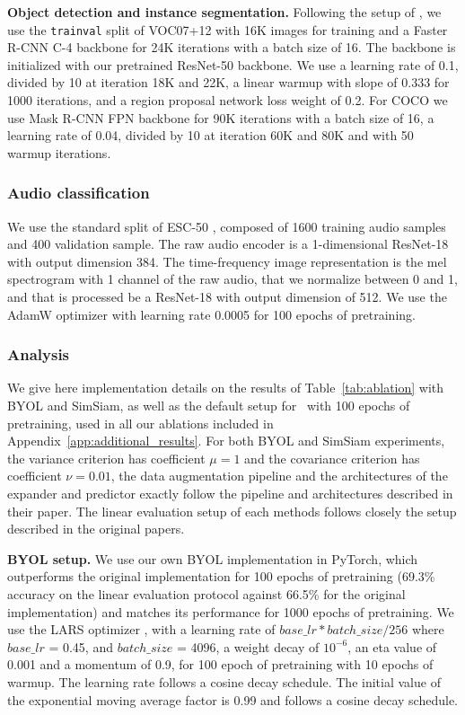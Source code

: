 \textbf{Object detection and instance segmentation.} Following the setup of \cite{he2020moco, zbontar2021barlow}, we use the \texttt{trainval} split of VOC07+12 with 16K images for training and a Faster R-CNN C-4 backbone for 24K iterations with a batch size of 16. The backbone is initialized with our pretrained ResNet-50 backbone. We use a learning rate of 0.1, divided by 10 at iteration 18K and 22K, a linear warmup with slope of 0.333 for 1000 iterations, and a region proposal network loss weight of 0.2. For COCO we use Mask R-CNN FPN backbone for 90K iterations with a batch size of 16, a learning rate of 0.04, divided by 10 at iteration 60K and 80K and with 50 warmup iterations.

\subsubsection{Audio classification} \label{app:audio}
We use the standard split of ESC-50 \cite{piczak2015dataset}, composed of 1600 training audio samples and 400 validation sample. The raw audio encoder is a 1-dimensional ResNet-18 with output dimension 384. The time-frequency image representation is the mel spectrogram with 1 channel of the raw audio, that we normalize between 0 and 1, and that is processed be a ResNet-18 with output dimension of 512. We use the AdamW optimizer with learning rate 0.0005 for 100 epochs of pretraining. %

\subsubsection{Analysis} \label{app:ablation}

We give here implementation details on the results of Table~\ref{tab:ablation} with BYOL and SimSiam, as well as the default setup for \algo \ with 100 epochs of pretraining, used in all our ablations included in Appendix~\ref{app:additional_results}. For both BYOL and SimSiam experiments, the variance criterion has coefficient $\mu=1$ and the covariance criterion has coefficient $\nu=0.01$, the data augmentation pipeline and the architectures of the expander and predictor exactly follow the pipeline and architectures described in their paper. The linear evaluation setup of each methods follows closely the setup described in the original papers.

\textbf{BYOL setup.} We use our own BYOL implementation in PyTorch, which outperforms the original implementation for 100 epochs of pretraining (69.3\% accuracy on the linear evaluation protocol against 66.5\% for the original implementation) and matches its performance for 1000 epochs of pretraining. We use the LARS optimizer \cite{you2017lars}, with a learning rate of $base\_lr * batch\_size / 256$ where $base\_lr$ = 0.45, and $batch\_size$ = 4096, a weight decay of $10^{-6}$, an eta value of 0.001 and a momentum of 0.9, for 100 epoch of pretraining with 10 epochs of warmup. The learning rate follows a cosine decay schedule. The initial value of the exponential moving average factor is 0.99 and follows a cosine decay schedule. 

